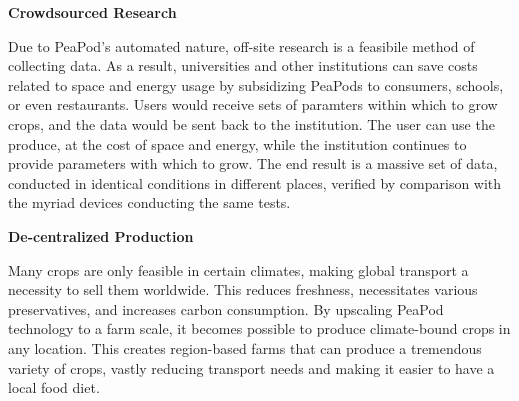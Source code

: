 \documentclass{report}
\begin{document}
\textbf{Crowdsourced Research} %

Due to PeaPod's automated nature, off-site research is a feasibile method of collecting data. As a result, universities and other institutions can save costs related to space and energy usage by subsidizing PeaPods to consumers, schools, or even restaurants. Users would receive sets of paramters within which to grow crops, and the data would be sent back to the institution. The user can use the produce, at the cost of space and energy, while the institution continues to provide parameters with which to grow. The end result is a massive set of data, conducted in identical conditions in different places, verified by comparison with the myriad devices conducting the same tests.

\textbf{De-centralized Production} %

Many crops are only feasible in certain climates, making global transport a necessity to sell them worldwide. This reduces freshness, necessitates various preservatives, and increases carbon consumption. By upscaling PeaPod technology to a farm scale, it becomes possible to produce climate-bound crops in any location. This creates region-based farms that can produce a tremendous variety of crops, vastly reducing transport needs and making it easier to have a local food diet.




% 
% 
\end{document}
